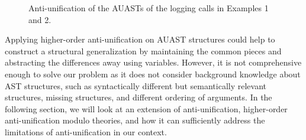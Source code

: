 \begin{figure}[p]
\begin{small}
\end{small}
\caption{Anti-unification of the AUASTs of the logging calls in Examples 1 and 2.\label{fig:logging-anti}}
\end{figure}

Applying higher-order anti-unification on AUAST structures could help to construct a structural generalization by maintaining the common pieces and abstracting the differences away using variables. However, it is not comprehensive enough to solve our problem as it does not consider background knowledge about AST structures, such as syntactically different but semantically relevant structures, missing structures, and different ordering of arguments. In the following section, we will look at an extension of anti-unification, higher-order anti-unification modulo theories, and how it can sufficiently address the limitations of anti-unification in our context.



